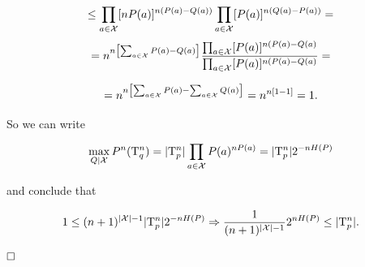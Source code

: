 \[
\leq \prod_{a \in \mathcal{X}} [nP(a)]^{n(P(a)-Q(a))}\prod_{a\in\mathcal{X}}[P(a)]^{n(Q(a)-P(a))} =
\]
\[
 = n^{n\left[\sum_{a \in \mathcal{X}}P(a) - Q(a)\right ]} \dfrac{\prod_{a \in \mathcal{X}}[P(a)]^{n(P(a)-Q(a)}}{\prod_{a \in \mathcal{X}}[P(a)]^{n(P(a)-Q(a)}} =
\]

\[ 
= n^{n\left [\sum_{a \in\mathcal{X}}P(a) -\sum_{a \in\mathcal{X}}Q(a) \right]} = n^{n[1-1]} = 1.
\]

So we can write

\[
 \max_{Q|\mathcal{X}}P^n(\mathrm{T}_q^n) = |\mathrm{T}_p^n|\prod_{a \in \mathcal{X}}P(a)^{nP(a)} = |\mathrm{T}_p^n|2^{-nH(P)}
\]

and conclude that

\[
 1 \leq (n+1)^{|\mathcal{X}|-1} |\mathrm{T}_p^n|2^{-nH(P)} \Rightarrow  \dfrac{1}{(n+1)^{|\mathcal{X}|-1}} 2^{nH(P)} \leq |\mathrm{T}_p^n|. 
\]

$\hfill\Box$

